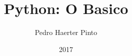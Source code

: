 \documentclass{article}
\title{Python: O Basico}
\author{Pedro Haerter Pinto}
\date{2017}
\begin{document}
\newcommand{\code}[1]{{\bfseries \itshape \begin{center}#1 \end{center}}}
\newcommand{\si}{\noindent}
\newcommand{\bd}[1]{{\bfseries #1}}
\newcommand{\itc}[1]{{\itshape #1}}

\maketitle
\tableofcontents




\end{document}
